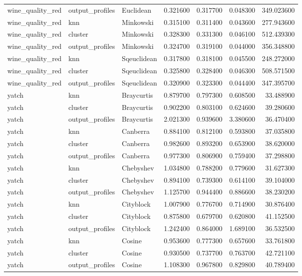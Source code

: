 \begin{tabular}{lllrrrr}
wine\_quality\_red & output\_profiles & Euclidean & 0.321600 & 0.317700 & 0.048300 & 349.023600 \\
wine\_quality\_red & knn & Minkowski & 0.315100 & 0.311400 & 0.043600 & 277.943600 \\
wine\_quality\_red & cluster & Minkowski & 0.328300 & 0.331300 & 0.046100 & 512.439300 \\
wine\_quality\_red & output\_profiles & Minkowski & 0.324700 & 0.319100 & 0.044000 & 356.348800 \\
wine\_quality\_red & knn & Sqeuclidean & 0.317800 & 0.318100 & 0.045500 & 248.272000 \\
wine\_quality\_red & cluster & Sqeuclidean & 0.325800 & 0.328400 & 0.046300 & 508.571500 \\
wine\_quality\_red & output\_profiles & Sqeuclidean & 0.320900 & 0.323300 & 0.044400 & 347.395700 \\
yatch & knn & Braycurtis & 0.879700 & 0.797300 & 0.608500 & 33.488900 \\
yatch & cluster & Braycurtis & 0.902200 & 0.803100 & 0.624600 & 39.280600 \\
yatch & output\_profiles & Braycurtis & 2.021300 & 0.939600 & 3.380600 & 36.470400 \\
yatch & knn & Canberra & 0.884100 & 0.812100 & 0.593800 & 37.035800 \\
yatch & cluster & Canberra & 0.982600 & 0.893200 & 0.653900 & 38.620000 \\
yatch & output\_profiles & Canberra & 0.977300 & 0.806900 & 0.759400 & 37.298800 \\
yatch & knn & Chebyshev & 1.034800 & 0.788200 & 0.779600 & 31.627300 \\
yatch & cluster & Chebyshev & 0.894100 & 0.739300 & 0.614100 & 39.104000 \\
yatch & output\_profiles & Chebyshev & 1.125700 & 0.944400 & 0.886600 & 38.230200 \\
yatch & knn & Cityblock & 1.007900 & 0.776700 & 0.714900 & 30.876400 \\
yatch & cluster & Cityblock & 0.875800 & 0.679700 & 0.620800 & 41.152500 \\
yatch & output\_profiles & Cityblock & 1.242400 & 0.864000 & 1.689100 & 36.532500 \\
yatch & knn & Cosine & 0.953600 & 0.777300 & 0.657600 & 33.761800 \\
yatch & cluster & Cosine & 0.930500 & 0.737700 & 0.763700 & 42.721100 \\
yatch & output\_profiles & Cosine & 1.108300 & 0.967800 & 0.829800 & 40.789400 \\

\end{tabular}
